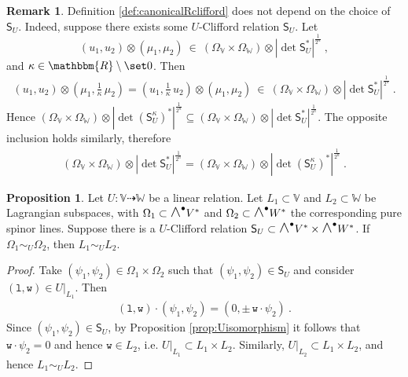 \documentclass[a4paper, reqno, 11pt]{amsart}
\numberwithin{equation}{section}
\theoremstyle{definition}
\newtheorem{proposition}[equation]{Proposition}
\newtheorem{remark}[equation]{Remark}
\newcommand{\IR}{\mathbbm{R}}
\newcommand{\IV}{\mathbb{V}}
\newcommand{\IW}{\mathbb{W}}
\newcommand{\sfS}{{\mathsf{S}}}
\newcommand{\midwedge}{\text {\Large$\wedge$}}
\newcommand{\rel}{\dashrightarrow}
\theoremstyle{remark}
\begin{document}
\begin{remark}
Definition \ref{def:canonicalRclifford} does not depend on the choice of $\sfS_U$. Indeed, suppose there exists some $U$-Clifford relation $\sfS_U$. Let $$(u_1, u_2) \otimes (\mu_1, \mu_2) \ \in \ (\Omega_\IV \times \Omega_\IW)\otimes |\det \sfS_U^* |^{\frac{1}{2^n}} \ , $$ and $\kappa \in \IR \setminus \set 0$. Then
\begin{align}
    (u_1, u_2) \otimes (\mu_1, \tfrac 1\kappa\, \mu_2) = (u_1, \tfrac 1 \kappa\, u_2) \otimes (\mu_1, \mu_2) \ \in \ (\Omega_\IV \times \Omega_\IW)\otimes |\det \sfS_U^* |^{\frac{1}{2^n}} \ .
\end{align}
Hence $(\Omega_\IV \times \Omega_\IW)\otimes |\det (\sfS_U^\kappa)^* |^{\frac{1}{2^n}} \subseteq (\Omega_\IV \times \Omega_\IW)\otimes |\det \sfS_U^* |^{\frac{1}{2^n}}$. The opposite inclusion holds similarly, therefore
\begin{align}
    (\Omega_\IV \times \Omega_\IW)\otimes |\det \sfS_U^* |^{\frac{1}{2^n}} = (\Omega_\IV \times \Omega_\IW)\otimes |\det (\sfS_U^\kappa)^* |^{\frac{1}{2^n}} \ .
\end{align}
\end{remark}

\begin{proposition}\label{prop:LreliffUrel}
    Let $U \colon \IV \rel \IW$ be a linear relation. Let $L_1 \subset \IV$ and $L_2 \subset \IW$ be Lagrangian subspaces, with $\Omega_1 \subset \midwedge^\bullet V^*$ and $\Omega_2 \subset \midwedge^\bullet W^*$ the corresponding pure spinor lines. Suppose there is a $U$-Clifford relation $\sfS_U \subset \midwedge^\bullet V^* \times \midwedge^\bullet W^*$.
    If $\Omega_1 \sim_U \Omega_2$, then $L_1 \sim_U L_2$. 
\end{proposition}

\begin{proof}
    Take $(\psi_1,\psi_2) \in \Omega_1 \times \Omega_2$ such that $(\psi_1,\psi_2) \in \sfS_U$ and consider $(\texttt{l}, \texttt{w})\in U|_{L_1}$. Then
    \begin{align}
        (\texttt{l}, \texttt{w}) \cdot (\psi_1, \psi_2) = (0, \pm\,\texttt{w}\cdot \psi_2) \ .
    \end{align}
    Since $(\psi_1,\psi_2) \in \sfS_U$, by Proposition \ref{prop:Uisomorphism} it follows that $\texttt{w}\cdot \psi_2 = 0$ and hence $\texttt{w}\in L_2$, i.e. $U|_{L_1} \subset L_1 \times L_2$. Similarly, $U|_{L_2} \subset L_1 \times L_2$, and hence $L_1 \sim_U L_2$.
\end{proof}
\end{document}
